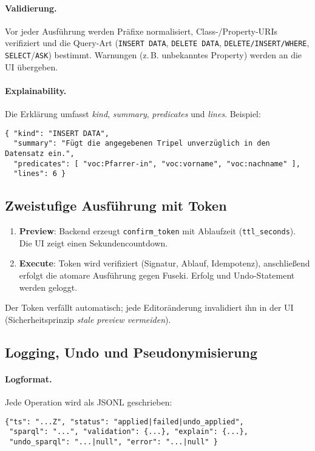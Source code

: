 \paragraph{Validierung.}
Vor jeder Ausführung werden Präfixe normalisiert, Class-/Property-URIs verifiziert und die Query-Art (\texttt{INSERT DATA}, \texttt{DELETE DATA}, \texttt{DELETE/INSERT/WHERE}, \texttt{SELECT}/\texttt{ASK}) bestimmt. Warnungen (z.\,B. unbekanntes Property) werden an die UI übergeben.

\paragraph{Explainability.}
Die Erklärung umfasst \emph{kind}, \emph{summary}, \emph{predicates} und \emph{lines}. Beispiel:
\begin{verbatim}
{ "kind": "INSERT DATA",
  "summary": "Fügt die angegebenen Tripel unverzüglich in den Datensatz ein.",
  "predicates": [ "voc:Pfarrer-in", "voc:vorname", "voc:nachname" ],
  "lines": 6 }
\end{verbatim}

\subsection{Zweistufige Ausführung mit Token}
\begin{enumerate}
  \item \textbf{Preview}: Backend erzeugt \texttt{confirm\_token} mit Ablaufzeit (\texttt{ttl\_seconds}). Die UI zeigt einen Sekundencountdown.
  \item \textbf{Execute}: Token wird verifiziert (Signatur, Ablauf, Idempotenz), anschließend erfolgt die atomare Ausführung gegen Fuseki. Erfolg und Undo-Statement werden geloggt.
\end{enumerate}
Der Token verfällt automatisch; jede Editoränderung invalidiert ihn in der UI (Sicherheitsprinzip \emph{stale preview vermeiden}).

\subsection{Logging, Undo und Pseudonymisierung}
\paragraph{Logformat.}
Jede Operation wird als JSONL geschrieben:
\begin{verbatim}
{"ts": "...Z", "status": "applied|failed|undo_applied",
 "sparql": "...", "validation": {...}, "explain": {...},
 "undo_sparql": "...|null", "error": "...|null" }
\end{verbatim}

